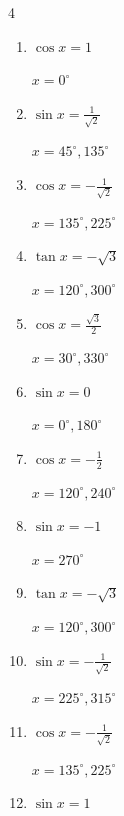 \begin{multicols}{4}
\begin{enumerate}
  \item $\displaystyle \cos{x}  = 1$

        $\displaystyle x = 0^{\circ}$

  \item $\displaystyle \sin{x}  = \frac{1}{\sqrt{2}}$

        $\displaystyle x = 45^{\circ} , 135^{\circ}$

  \item $\displaystyle \cos{x}  = -\frac{1}{\sqrt{2}}$

        $\displaystyle x = 135^{\circ} , 225^{\circ}$

  \item $\displaystyle \tan{x}  = -\sqrt{3}$

        $\displaystyle x = 120^{\circ} , 300^{\circ}$

  \item $\displaystyle \cos{x}  = \frac{\sqrt{3}}{2}$

        $\displaystyle x = 30^{\circ} , 330^{\circ}$

  \item $\displaystyle \sin{x}  = 0$

        $\displaystyle x = 0^{\circ} , 180^{\circ}$

  \item $\displaystyle \cos{x}  = -\frac{1}{2}$

        $\displaystyle x = 120^{\circ} , 240^{\circ}$

  \item $\displaystyle \sin{x}  = -1$

        $\displaystyle x = 270^{\circ}$

  \item $\displaystyle \tan{x}  = -\sqrt{3}$

        $\displaystyle x = 120^{\circ} , 300^{\circ}$

\columnbreak %

  \item $\displaystyle \sin{x}  = -\frac{1}{\sqrt{2}}$

        $\displaystyle x = 225^{\circ} , 315^{\circ}$

  \item $\displaystyle \cos{x}  = -\frac{1}{\sqrt{2}}$

        $\displaystyle x = 135^{\circ} , 225^{\circ}$

  \item $\displaystyle \sin{x}  = 1$


\end{enumerate}
\end{multicols}
